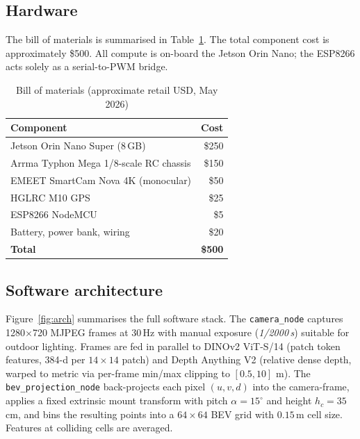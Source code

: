 \documentclass[conference]{IEEEtran}
\begin{document}
\subsection{Hardware}

The bill of materials is summarised in Table~\ref{tab:bom}. The total
component cost is approximately \$500. All compute is on-board the Jetson
Orin Nano; the ESP8266 acts solely as a serial-to-PWM bridge.

\begin{table}[!h]
  \centering
  \caption{Bill of materials (approximate retail USD, May 2026)}
  \label{tab:bom}
  \begin{tabular}{lr}
    \toprule
    Component & Cost \\
    \midrule
    Jetson Orin Nano Super (8\,GB) & \$250 \\
    Arrma Typhon Mega 1/8-scale RC chassis & \$150 \\
    EMEET SmartCam Nova 4K (monocular) & \$50 \\
    HGLRC M10 GPS & \$25 \\
    ESP8266 NodeMCU & \$5 \\
    Battery, power bank, wiring & \$20 \\
    \midrule
    \textbf{Total} & \textbf{\$500} \\
    \bottomrule
  \end{tabular}
\end{table}

\subsection{Software architecture}

Figure~\ref{fig:arch} summarises the full software stack. The
\texttt{camera\_node} captures 1280$\times$720 MJPEG frames at 30\,Hz with
manual exposure (\textit{1/2000\,s}) suitable for outdoor lighting. Frames
are fed in parallel to DINOv2 ViT-S/14 (patch token features, 384-d per
$14\times14$ patch) and Depth Anything V2 (relative dense depth, warped to
metric via per-frame min/max clipping to $[0.5, 10]$ m). The
\texttt{bev\_projection\_node} back-projects each pixel $(u, v, d)$ into the
camera-frame, applies a fixed extrinsic mount transform with pitch
$\alpha = 15^\circ$ and height $h_c = 35$\,cm, and bins the resulting points
into a $64\times64$ BEV grid with $0.15$\,m cell size. Features at colliding
cells are averaged.
\end{document}
